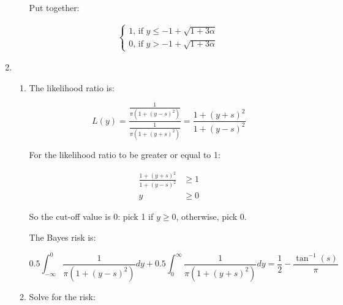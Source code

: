 \documentclass[11pt,letterpaper,titlepage]{article}
\begin{document}
\begin{enumerate}
\begin{enumerate}
        Put together:
        
        \begin{gather*}
            \begin{cases}
                1 \text{, if } y \leq -1 + \sqrt{1 + 3 \alpha} \\
                0 \text{, if } y > -1 + \sqrt{1 + 3 \alpha}
            \end{cases}
        \end{gather*}
        
    \end{enumerate}
    
    \item %
    
    \begin{enumerate}
        
        \item %
        
        The likelihood ratio is:
        
        \begin{equation*}
            L(y) = \frac{\frac{1}{\pi (1 + (y - s)^2)}}{\frac{1}{\pi (1 + (y + s)^2)}} = \frac{1 + (y + s)^2}{1 + (y - s)^2}
        \end{equation*}
        
        For the likelihood ratio to be greater or equal to 1:
        
        \begin{equation*}
            \begin{aligned}
                \frac{1 + (y + s)^2}{1 + (y - s)^2} &\geq 1 \\
                y &\geq 0
            \end{aligned}
        \end{equation*}
        
        So the cut-off value is 0: pick 1 if $y \geq 0$, otherwise, pick 0.
        
        The Bayes risk is:
        
        \begin{equation*}
            0.5 \int_{-\infty}^0 \frac{1}{\pi (1 + (y - s)^2)} dy + 0.5 \int_0^{\infty} \frac{1}{\pi (1 + (y + s)^2)} dy = \frac{1}{2} - \frac{\tan^{-1} (s)}{\pi}
        \end{equation*}
        
        \item %
        
        Solve for the risk:
        

\end{enumerate}
\end{enumerate}
\end{document}
